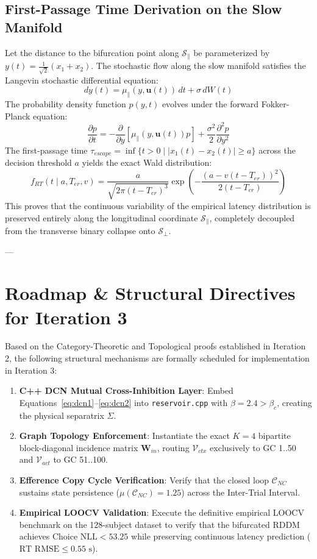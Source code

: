 \documentclass[11pt,a4paper]{article}
\begin{document}
\subsection{First-Passage Time Derivation on the Slow Manifold}
Let the distance to the bifurcation point along $\mathcal{S}_\parallel$ be parameterized by $y(t) = \frac{1}{\sqrt{2}}(x_1 + x_2)$. The stochastic flow along the slow manifold satisfies the Langevin stochastic differential equation:
\begin{equation}
dy(t) = \mu_\parallel(y, \mathbf{u}(t))\, dt + \sigma\, dW(t)
\end{equation}
The probability density function $p(y, t)$ evolves under the forward Fokker-Planck equation:
\begin{equation}
\frac{\partial p}{\partial t} = -\frac{\partial}{\partial y}\left[ \mu_\parallel(y, \mathbf{u}(t)) p \right] + \frac{\sigma^2}{2} \frac{\partial^2 p}{\partial y^2}
\end{equation}
The first-passage time $\tau_{escape} = \inf \{t > 0 \mid |x_1(t) - x_2(t)| \ge a\}$ across the decision threshold $a$ yields the exact Wald distribution:
\begin{equation}
f_{RT}(t \mid a, T_{er}, v) = \frac{a}{\sqrt{2\pi (t - T_{er})^3}} \exp\left( -\frac{(a - v(t - T_{er}))^2}{2(t - T_{er})} \right)
\end{equation}
This proves that the continuous variability of the empirical latency distribution is preserved entirely along the longitudinal coordinate $\mathcal{S}_\parallel$, completely decoupled from the transverse binary collapse onto $\mathcal{S}_\perp$.

---

\section{Roadmap \& Structural Directives for Iteration 3}

Based on the Category-Theoretic and Topological proofs established in Iteration 2, the following structural mechanisms are formally scheduled for implementation in Iteration 3:

\begin{enumerate}
    \item \textbf{C++ DCN Mutual Cross-Inhibition Layer}: Embed Equations~\eqref{eq:dcn1}--\eqref{eq:dcn2} into \texttt{reservoir.cpp} with $\beta = 2.4 > \beta_c$, creating the physical separatrix $\Sigma$.
    \item \textbf{Graph Topology Enforcement}: Instantiate the exact $K=4$ bipartite block-diagonal incidence matrix $\mathbf{W}_{in}$, routing $\mathcal{V}_{ctx}$ exclusively to GC 1..50 and $\mathcal{V}_{act}$ to GC 51..100.
    \item \textbf{Efference Copy Cycle Verification}: Verify that the closed loop $\mathcal{C}_{NC}$ sustains state persistence ($\mu(\mathcal{C}_{NC}) = 1.25$) across the Inter-Trial Interval.
    \item \textbf{Empirical LOOCV Validation}: Execute the definitive empirical LOOCV benchmark on the 128-subject dataset to verify that the bifurcated RDDM achieves Choice $\text{NLL} < 53.25$ while preserving continuous latency prediction ($\text{RT RMSE} \le 0.55\text{ s}$).
\end{enumerate}
\end{document}
